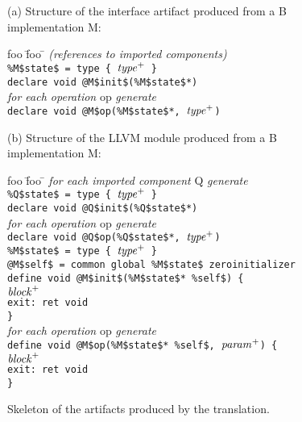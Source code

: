 \documentclass{llncs}
\newcommand{\llvm}[1]{\texttt{#1}}
\newcommand{\B}[1]{\textsf{#1}}
\newcommand{\ListOf}[1]{$\mbox{#1}^+$}
\newcommand{\nt}[1]{{\normalfont\textit{#1}}}
\begin{document}
\begin{figure}
  \begin{center}
    (a) Structure of the interface artifact produced from a B implementation \B{M}:
    \begin{tabbing}
      foo \= foo \= \kill
      \textit{(references to imported components)} \\
      \llvm{\%M\$state\$ = type \{ \ListOf{\nt{type}} \}} \\
      \llvm{declare void @M\$init\$(\%M\$state\$*)} \\
      \textit{for each operation} \B{op} \textit{generate} \\
      \> \llvm{declare void @M\$op(\%M\$state\$*, \ListOf{\nt{type}})} \\
    \end{tabbing}
    (b) Structure of the LLVM module produced from a B implementation \B{M}:
    \begin{tabbing}
      foo \= foo \= \kill
      \textit{for each imported component} \B{Q} \textit{generate} \\
      \> \llvm{\%Q\$state\$ = type \{ \ListOf{\nt{type}} \}} \\
      \> \llvm{declare void @Q\$init\$(\%Q\$state\$*)} \\
      \> \textit{for each operation} \B{op} \textit{generate} \\
      \> \> \llvm{declare void @Q\$op(\%Q\$state\$*, \ListOf{\nt{type}})} \\
      \llvm{\%M\$state\$ = type \{ \ListOf{\nt{type}} \}} \\
      \llvm{@M\$self\$ = common global \%M\$state\$ zeroinitializer} \\
      \llvm{define void @M\$init\$(\%M\$state\$* \%self\$) \{} \\
      \> \llvm{\ListOf{\nt{block}}} \\
      \> \llvm{exit: ret void} \\
      \llvm{\}} \\
      \textit{for each operation} \B{op} \textit{generate} \\
      \> \llvm{define void @M\$op(\%M\$state\$* \%self\$, \ListOf{\nt{param}}) \{} \\
      \> \> \llvm{\ListOf{\nt{block}}} \\
      \> \> \llvm{exit: ret void} \\
      \> \llvm{\}}
    \end{tabbing}
  \end{center}
  \caption{Skeleton of the artifacts produced by the translation.}
  \label{fig:skel}
\end{figure}
\end{document}
